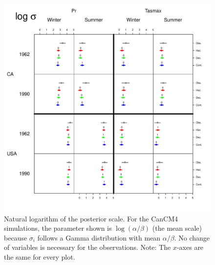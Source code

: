 \begin{figure}
\begin{center}
 \includegraphics[scale=0.61]{figs/log_sigma.pdf}
\end{center}
\caption{Natural logarithm of the posterior scale. For the CanCM4 simulations, the parameter shown is $\log (\alpha/\beta)$ (the mean scale) because $\sigma_i$ follows a Gamma distribution with mean $\alpha/\beta$. No change of variables is necessary for the observations. Note: The $x$-axes are the same for every plot.}
\label{sigma}
\end{figure}

